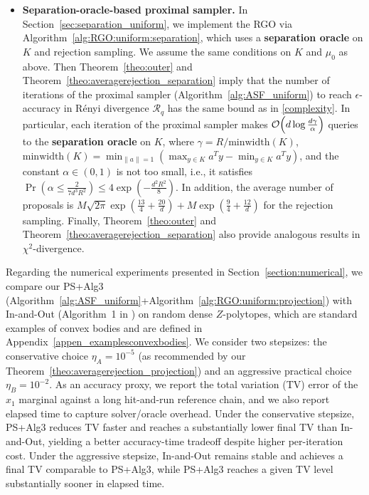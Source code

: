 \documentclass[11pt,letterpaper]{article}
\newcommand{\norm}[1]{\left\lVert #1 \right\rVert}
\newcommand{\brac}[1]{\left( #1\right)}
\begin{document}
\begin{itemize}
    \item \textbf{Separation-oracle-based proximal sampler.}
    In Section~\ref{sec:separation_uniform},  we implement the RGO via Algorithm~\ref{alg:RGO:uniform:separation}, which uses a \textbf{separation oracle} on $K$ and rejection sampling. We assume the same conditions on $K$ and $\mu_0$ as above. Then Theorem~\ref{theo:outer} and Theorem~\ref{theo:averagerejection_separation} imply that the number of iterations of the proximal sampler (Algorithm~\ref{alg:ASF_uniform}) to reach $\epsilon$-accuracy in R\'{e}nyi divergence $\mathcal{R}_q$ has the same bound as in \eqref{complexity}. In particular, each iteration of the proximal sampler makes ${\cal O}\!\left(d \log \frac{d \gamma}{\alpha}\right)$ queries to the \textbf{separation oracle} on $K$, where $\gamma=R/\mbox{minwidth}(K)$, $\mbox{minwidth}(K)=\min_{\norm{a}=1}\brac{\max_{y\in K}a^Ty-\min_{y\in K}a^Ty}$, and the constant $\alpha\in(0,1)$ is not too small, i.e., it satisfies $\Pr\brac{\alpha\leq \frac{2}{7 d^3 R^2} }\leq 4 \exp\brac{-\frac{d^2R^2}{8}}$.
    In addition, the average number of proposals is $M\sqrt{2\pi} \exp\brac{\frac{13}{4}+\frac{20}{d}} + M \exp\brac{\frac{9}{4}+\frac{12}{d}}$ for the rejection sampling. Finally, Theorem~\ref{theo:outer} and Theorem~\ref{theo:averagerejection_separation} also provide analogous results in $\chi^2$-divergence.
\end{itemize}

Regarding the numerical experiments presented in Section~\ref{section:numerical}, we compare  our PS+Alg3 (Algorithm~\ref{alg:ASF_uniform}+Algorithm~\ref{alg:RGO:uniform:projection}) with In-and-Out (Algorithm~1 in \cite{kook2024inandout}) on random dense $Z$-polytopes, which are standard examples of convex bodies and are defined in Appendix~\ref{appen_examplesconvexbodies}. We consider two stepsizes: the conservative choice $\eta_A=10^{-5}$ (as recommended by our Theorem~\ref{theo:averagerejection_projection}) and an aggressive practical choice $\eta_B=10^{-2}$. As an accuracy proxy, we report the total variation (TV) error of the $x_1$ marginal against a long hit-and-run reference chain, and we also report elapsed time to capture solver/oracle overhead. Under the conservative stepsize, PS+Alg3 reduces TV faster and reaches a substantially lower final TV than In-and-Out, yielding a better accuracy-time tradeoff despite higher per-iteration cost. Under the aggressive stepsize, In-and-Out remains stable and achieves a final TV comparable to PS+Alg3, while PS+Alg3 reaches a given TV level substantially sooner in elapsed time.
\end{document}
